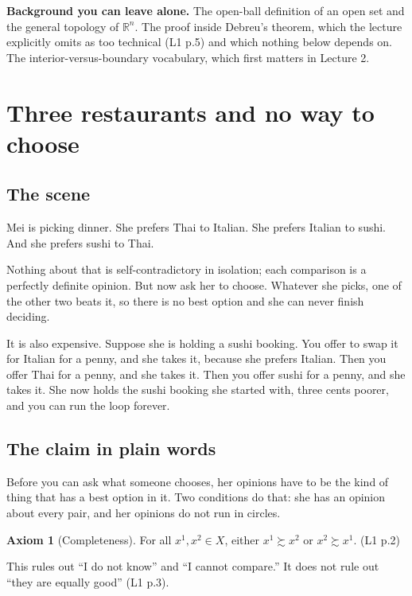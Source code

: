 \documentclass[11pt,letterpaper]{article}
\theoremstyle{definition}
\newtheorem{axiom}{Axiom}
\theoremstyle{plain}
\newcommand{\src}[1]{{\small\textsf{(#1)}}}
\newcommand{\wpref}{\succsim}
\begin{document}
\begin{snugshade}
\noindent\textbf{Background you can leave alone.} The open-ball definition of an open set and the
general topology of $\mathbb{R}^n$. The proof inside Debreu's theorem, which the lecture explicitly
omits as too technical \src{L1 p.5} and which nothing below depends on. The interior-versus-boundary
vocabulary, which first matters in Lecture 2.
\end{snugshade}
\section{Three restaurants and no way to choose}
\label{sec:q1}

\subsection{The scene}

Mei is picking dinner. She prefers Thai to Italian. She prefers Italian to sushi. And she prefers
sushi to Thai.

Nothing about that is self-contradictory in isolation; each comparison is a perfectly definite
opinion. But now ask her to choose. Whatever she picks, one of the other two beats it, so there is no
best option and she can never finish deciding.

It is also expensive. Suppose she is holding a sushi booking. You offer to swap it for Italian for a
penny, and she takes it, because she prefers Italian. Then you offer Thai for a penny, and she takes
it. Then you offer sushi for a penny, and she takes it. She now holds the sushi booking she started
with, three cents poorer, and you can run the loop forever.

\subsection{The claim in plain words}

Before you can ask what someone chooses, her opinions have to be the kind of thing that has a best
option in it. Two conditions do that: she has an opinion about every pair, and her opinions do not
run in circles.

\begin{axiom}[Completeness] For all $x^1, x^2 \in X$, either $x^1 \wpref x^2$ or $x^2 \wpref x^1$.
\src{L1 p.2}
\end{axiom}

This rules out ``I do not know'' and ``I cannot compare.'' It does not rule out ``they are equally
good'' \src{L1 p.3}.
\end{document}
